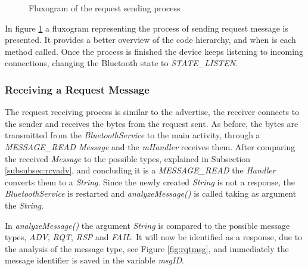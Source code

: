 \begin{figure}[ht]
   \noindent{}
	\caption{\label{fig:rqtflux} Fluxogram of the request sending process}
\end{figure}

In figure \ref{fig:rqtflux} a fluxogram representing the process of sending request message is presented. It provides a better overview of the code hierarchy, and when is each method called. Once the process is finished the device keeps listening to incoming connections, changing the Bluetooth state to \textit{STATE\_LISTEN}.

\subsubsection{Receiving a Request Message}
\label{subsubsec:rcvrqt}

The request receiving process is similar to the advertise, the receiver connects to the sender and receives the bytes from the request sent. As before, the bytes are transmitted from the \textit{BluetoothService} to the main activity, through a \textit{MESSAGE\_READ Message} and the \textit{mHandler} receives them. After comparing the received \textit{Message} to the possible types, explained in Subsection \ref{subsubsec:rcvadv}, and concluding it is a \textit{MESSAGE\_READ} the \textit{Handler} converts them to a \textit{String}. Since the newly created \textit{String} is not a response, the \textit{BluetoothService} is restarted and \textit{analyzeMessage()} is called taking as argument the \textit{String}.

In \textit{analyzeMessage()} the argument \textit{String} is compared to the possible message types, \textit{ADV}, \textit{RQT}, \textit{RSP} and \textit{FAIL}. It will now be identified as a response, due to the analysis of the message type, see Figure \ref{fig:rqtmsg}, and immediately the message identifier is saved in the variable \textit{msgID}.

